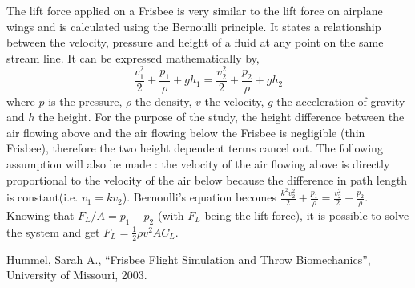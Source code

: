 \documentclass[10pt,a4paper]{report}
\begin{document}
The lift force applied on a Frisbee is very similar to the lift force on
airplane wings and is calculated using the Bernoulli principle. It states a relationship between the velocity, pressure and height of a fluid at any point on the same stream line. It can be expressed mathematically by,
\[\frac{v_1^2}{2} + \frac{p_1}{\rho} + gh_1 = \frac{v_2^2}{2} + \frac{p_2}{\rho} + gh_2\]
where $p$ is the pressure, $\rho$ the density, $v$ the velocity, $g$ the acceleration of gravity and $h$ the height. For the purpose of the study, the height difference between the air flowing above and the air flowing below the Frisbee is negligible (thin Frisbee), therefore the two height dependent terms cancel out. The following assumption will also be made : the velocity of the air flowing above is directly proportional to the velocity of the air below because the difference in path length is constant(i.e. $v_1 = kv_2$). Bernoulli's equation becomes $\frac{k^2v_2^2}{2} + \frac{p_1}{\rho} = \frac{v_2^2}{2} + \frac{p_2}{\rho}$. Knowing that $F_L/A = p_1 - p_2$ (with $F_L$ being the lift force), it is possible to solve the system and get $F_L = \frac{1}{2} \rho v^2 A C_L$. 

\begin{thebibliography}{9}

  Hummel, Sarah A.,
  “Frisbee Flight Simulation and Throw Biomechanics”,
  University of Missouri,
  2003.

\end{thebibliography}
\end{document}
